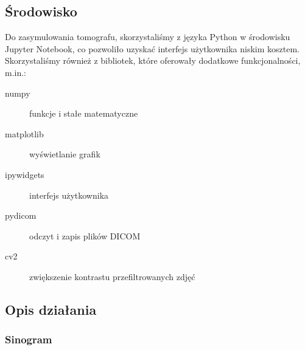 \documentclass[polish,polish,a4paper]{article}
\begin{document}
		\subsection{Środowisko}
			Do zasymulowania tomografu,
			 skorzystaliśmy z języka Python w środowisku Jupyter Notebook,
			 co pozwoliło uzyskać interfejs użytkownika niskim kosztem.
			 Skorzystaliśmy również z bibliotek, które oferowały dodatkowe funkcjonalności, m.in.:
			
			\begin{description}
				\item[numpy] funkcje i stałe matematyczne
				\item[matplotlib] wyświetlanie grafik
				\item[ipywidgets] interfejs użytkownika
				\item[pydicom] odczyt i zapis plików DICOM
				\item[cv2] zwiększenie kontrastu przefiltrowanych zdjęć
			\end{description}
			
			\subsection{Opis działania}
				\subsubsection{Sinogram}
				
\end{document}
